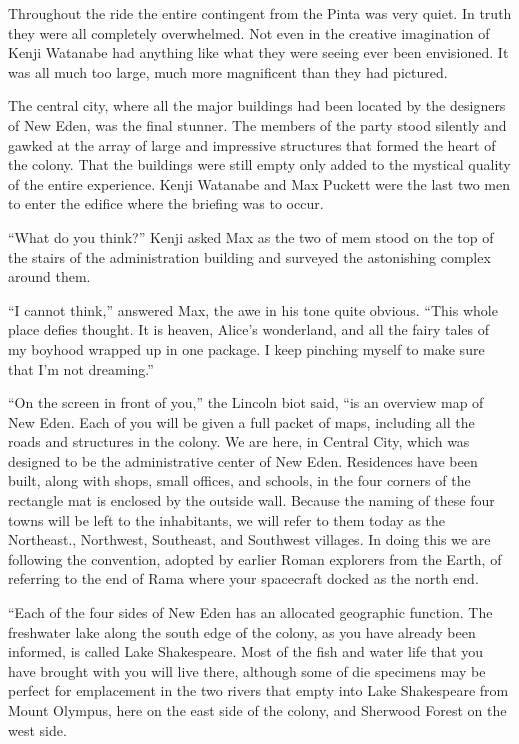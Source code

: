 \documentclass[]{article}
\begin{document}
{Throughout the ride the entire contingent from the Pinta was very quiet. In truth they were all completely overwhelmed. Not even in the creative imagination of Kenji Watanabe had anything like what they were seeing ever been envisioned. It was all much too large, much more magnificent than they had pictured.

The central city, where all the major buildings had been located by the designers of New Eden, was the final stunner. The members of the party stood silently and gawked at the array of large and impressive structures that formed the heart of the colony. That the buildings were still empty only added to the mystical quality of the entire experience. Kenji Watanabe and Max Puckett were the last two men to enter the edifice where the briefing was to occur.

“What do you think?” Kenji asked Max as the two of mem stood on the top of the stairs of the administration building and surveyed the astonishing complex around them.

“I cannot think,” answered Max, the awe in his tone quite obvious. “This whole place defies thought. It is heaven, Alice’s wonderland, and all the fairy tales of my boyhood wrapped up in one package. I keep pinching myself to make sure that I’m not dreaming.”

“On the screen in front of you,” the Lincoln biot said, “is an overview map of New Eden. Each of you will be given a full packet of maps, including all the roads and structures in the colony. We are here, in Central City, which was designed to be the administrative center of New Eden. Residences have been built, along with shops, small offices, and schools, in the four corners of the rectangle mat is enclosed by the outside wall. Because the naming of these four towns will be left to the inhabitants, we will refer to them today as the Northeast., Northwest, Southeast, and Southwest villages. In doing this we are following the convention, adopted by earlier Roman explorers from the Earth, of referring to the end of Rama where your spacecraft docked as the north end.

“Each of the four sides of New Eden has an allocated geographic function. The freshwater lake along the south edge of the colony, as you have already been informed, is called Lake Shakespeare. Most of the fish and water life that you have brought with you will live there, although some of die specimens may be perfect for emplacement in the two rivers that empty into Lake Shakespeare from Mount Olympus, here on the east side of the colony, and Sherwood Forest on the west side.

}
\end{document}

